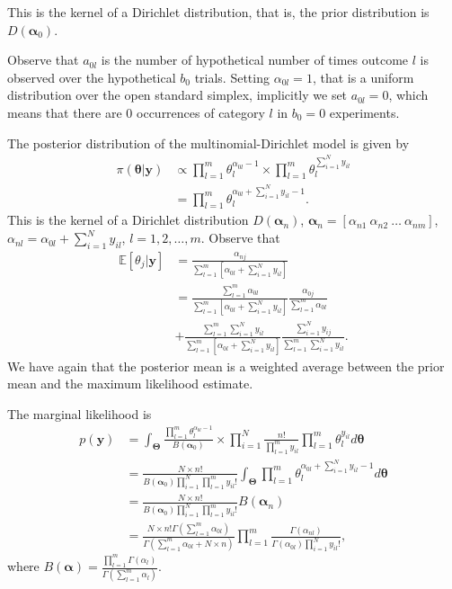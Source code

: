\begin{enumerate}
This is the kernel of a Dirichlet distribution, that is, the prior distribution is $D(\bm{\alpha}_0)$.

Observe that $a_{0l}$ is the number of hypothetical number of times outcome $l$ is observed over the hypothetical $b_0$ trials. Setting $\alpha_{0l}=1$, that is a uniform distribution over the open standard simplex, implicitly we set $a_{0l}=0$, which means that there are 0 occurrences of category $l$ in $b_0=0$ experiments.    

The posterior distribution of the multinomial-Dirichlet model is given by
\begin{align}
	\pi(\bm{\theta}|\bm{y})&\propto \prod_{l=1}^m \theta_l^{\alpha_{0l}-1}\times\prod_{l=1}^m \theta_l^{\sum_{i=1}^{N} y_{il}}\nonumber\\
	&=\prod_{l=1}^m \theta_l^{\alpha_{0l}+\sum_{i=1}^{N} y_{il}-1}\nonumber.
\end{align}
This is the kernel of a Dirichlet distribution $D(\bm{\alpha}_n)$, $\bm{\alpha}_n=\left[\alpha_{n1} \ \alpha_{n2} \ \dots \ \alpha_{nm}\right]$, $\alpha_{nl}=\alpha_{0l}+\sum_{i=1}^{N}y_{il}$, $l=1,2,\dots,m$. Observe that
\begin{align}
	\mathbb{E}[\theta_{j}|\bm{y}]&=\frac{\alpha_{nj}}{\sum_{l=1}^m \left[\alpha_{0l}+\sum_{i=1}^N y_{il}\right]}\nonumber\\
	&=\frac{\sum_{l=1}^m \alpha_{0l}}{\sum_{l=1}^m \left[\alpha_{0l}+\sum_{i=1}^N y_{il}\right]}\frac{\alpha_{0j}}{\sum_{l=1}^m \alpha_{0l}}\nonumber\\
	&+\frac{\sum_{l=1}^m\sum_{i=1}^N y_{il}}{\sum_{l=1}^m \left[\alpha_{0l}+\sum_{i=1}^N y_{il}\right]}\frac{\sum_{i=1}^N y_{ij}}{\sum_{l=1}^m\sum_{i=1}^N y_{il}}.\nonumber
\end{align}
We have again that the posterior mean is a weighted average between the prior mean and the maximum likelihood estimate.

The marginal likelihood is
\begin{align}
	p(\bm{y})&=\int_{\bm{\Theta}}\frac{\prod_{l=1}^m \theta_l^{\alpha_{0l}-1}}{B(\bm{\alpha}_0)}\times \prod_{i=1}^N\frac{n!}{\prod_{l=1}^m y_{il}}\prod_{l=1}^m \theta_{l}^{y_{il}}d\bm{\theta}\nonumber\\
	&=\frac{N\times n!}{B(\bm{\alpha}_0)\prod_{i=1}^N\prod_{l=1}^m y_{il}!}\int_{\bm{\Theta}} \prod_{l=1}^m \theta_l^{\alpha_{0l}+\sum_{i=1}^N y_{il}-1} d\bm{\theta}\nonumber\\
	&=\frac{N\times n!}{B(\bm{\alpha}_0)\prod_{i=1}^N\prod_{l=1}^m y_{il}!}B(\bm{\alpha}_n)\nonumber\\
	&=\frac{N\times n! \Gamma\left(\sum_{l=1}^m\nonumber \alpha_{0l}\right)}{\Gamma\left(\sum_{l=1}^m \alpha_{0l}+N\times n\right)}\prod_{l=1}^m \frac{\Gamma\left( \alpha_{nl}\right)}{\Gamma\left(\alpha_{0l}\right)\prod_{i=1}^N y_{il}!},\nonumber
\end{align}
where $B(\bm{\alpha})=\frac{\prod_{l=1}^m\Gamma(\alpha_l)}{\Gamma\left(\sum_{l=1}^m \alpha_l\right)}$.


\end{enumerate}
